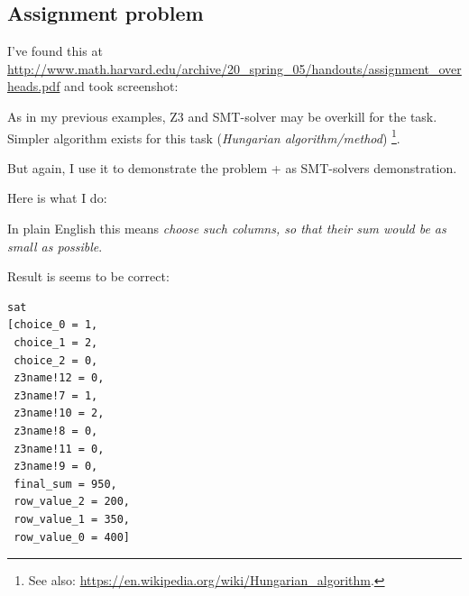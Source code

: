 \subsection{Assignment problem}
\label{assign_problem}

I've found this at \url{http://www.math.harvard.edu/archive/20_spring_05/handouts/assignment_overheads.pdf} and took screenshot:

\begin{figure}[H]
\centering
{}
\end{figure}

As in my previous examples, Z3 and SMT-solver may be overkill for the task.
Simpler algorithm exists for this task (\textit{Hungarian algorithm/method})
\footnote{See also: \url{https://en.wikipedia.org/wiki/Hungarian_algorithm}.}.

But again, I use it to demonstrate the problem + as SMT-solvers demonstration.

Here is what I do:



In plain English this means \textit{choose such columns, so that their sum would be as small as possible}.

Result is seems to be correct:

\begin{lstlisting}
sat
[choice_0 = 1,
 choice_1 = 2,
 choice_2 = 0,
 z3name!12 = 0,
 z3name!7 = 1,
 z3name!10 = 2,
 z3name!8 = 0,
 z3name!11 = 0,
 z3name!9 = 0,
 final_sum = 950,
 row_value_2 = 200,
 row_value_1 = 350,
 row_value_0 = 400]
\end{lstlisting}


